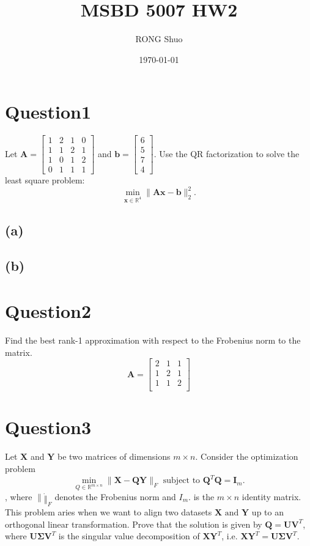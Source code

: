 \documentclass{article}
\title{MSBD 5007 HW2}
\author{RONG Shuo}
\date{\today}
\newcommand{\R}{\mathbb{R}}
\begin{document}
\maketitle

\section*{Question1}
Let \(\bm{A} = \begin{bmatrix}
    1 & 2 & 1 & 0 \\ 
    1 & 1 & 2 & 1 \\ 
    1 & 0 & 1 & 2 \\ 
    0 & 1 & 1 & 1  
\end{bmatrix}\) and \(\bm{b} = \begin{bmatrix}
    6 \\
    5 \\
    7 \\
    4 
\end{bmatrix}\). Use the QR factorization to solve the least square problem:
\[
    \min_{\bm{x} \in \R^4} \|\bm{Ax} - \bm{b}\|_2^2.
\]

\subsection*{(a)}

\subsection*{(b)}

\section*{Question2}
Find the best rank-1 approximation with respect to the Frobenius norm to the matrix.
\[\bm{A} = \begin{bmatrix}
   2 & 1 & 1 \\ 
   1 & 2 & 1 \\ 
   1 & 1 & 2 \\ 
\end{bmatrix}\]
\section*{Question3}
Let \(\bm{X}\) and \(\bm{Y}\) be two matrices of dimensions \(m \times n\). Consider the optimization problem
\[
    \min_{Q\in\R^{m\times n}} \|\bm{X} - \bm{QY}\|_F \text{ subject to } \bm{Q}^T\bm{Q} = \bm{I}_m.
\],
where \(\|\dot\|_F\) denotes the Frobenius norm and \(I_m\). is the \(m \times n\) identity matrix. This problem aries when we want to align two datasets \(\bm{X} \text{ and }\bm{Y}\) up to an orthogonal linear transformation. Prove that the solution is given by \(\bm{Q} = \bm{U}\bm{V}^T\), where \(\bm{U}\bm{\Sigma}\bm{V}^T\) is the singular value decomposition of \(\bm{XY}^T\), i.e. \(\bm{X}\bm{Y}^T = \bm{U}\bm{\Sigma}\bm{V}^T\).
\end{document}
